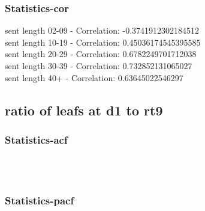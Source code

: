 \documentclass{article}%
\begin{document}
%
\newpage%
\subsubsection{Statistics{-}cor}%
\label{ssubsec:Statistics{-}cor}%
\noindent%
sent length 02-09 - Correlation: -0.3741912302184512\\%
sent length 10-19 - Correlation: 0.45036174545395585\\%
sent length 20-29 - Correlation: 0.6782249701712038\\%
sent length 30-39 - Correlation: 0.732852131065027\\%
sent length 40+ - Correlation: 0.63645022546297\\

%
\newpage

%
\subsection{ratio of leafs at d1 to rt9}%
\label{subsec:ratioofleafsatd1tort9}%
\subsubsection{Statistics{-}acf}%
\label{ssubsec:Statistics{-}acf}%


\begin{figure}[ht]%
\centering%
\setlength{\abovecaptionskip}{-35pt}%
%
%
\\%
%
%
\\%
%
\end{figure}

%
\newpage%
\subsubsection{Statistics{-}pacf}%
\label{ssubsec:Statistics{-}pacf}%
\end{document}
